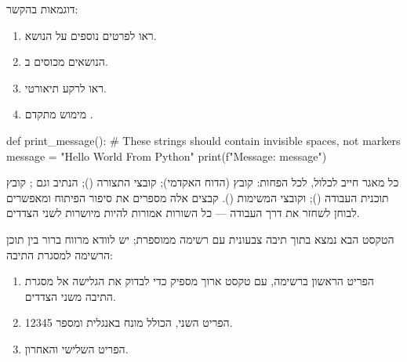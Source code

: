 \documentclass{hebrew-academic-template}
\begin{document}
דוגמאות בהקשר:
\begin{enumerate}
    \item ראו  לפרטים נוספים על הנושא.
    \item הנושאים מכוסים ב.
    \item ראו  לרקע תיאורטי.
    \item מימוש מתקדם .
\end{enumerate}


\begin{english}
\begin{pythonbox}
def print_message():
    # These strings should contain invisible spaces, not markers
    message = "Hello World From Python"
    print(f"Message: {message}")
\end{pythonbox}
\end{english}

כל מאגר  חייב לכלול, לכל הפחות: קובץ  (הדוח האקדמי); קובצי התצורה (); הנתיב  וגם ; קובץ תוכנית העבודה (); וקובצי המשימות (). קבצים אלה מספרים את סיפור הפיתוח ומאפשרים לבוחן לשחזר את דרך העבודה — כל השורות אמורות להיות מיושרות לשני הצדדים.


\begin{exercisebox}
הטקסט הבא נמצא בתוך תיבה צבעונית עם רשימה ממוספרת; יש לוודא מרווח ברור בין תוכן הרשימה למסגרת התיבה:
\begin{enumerate}
  \item הפריט הראשון ברשימה, עם טקסט ארוך מספיק כדי לבדוק את הגלישה אל מסגרת התיבה משני הצדדים.
  \item הפריט השני, הכולל מונח באנגלית  ומספר \num{12345}.
  \item הפריט השלישי והאחרון.
\end{enumerate}
\end{exercisebox}
\end{document}
